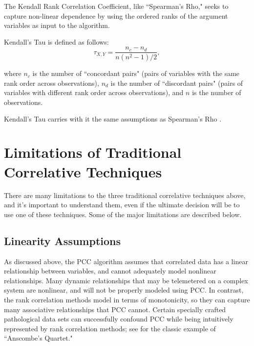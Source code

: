 The Kendall Rank Correlation Coefficient, like ``Spearman's Rho," seeks to capture non-linear dependence by using the ordered ranks of the argument variables as input to the algorithm.

Kendall's Tau is defined as follows:
\begin{equation} \label{eq:tau}
\tau_{X, Y} = \frac{n_{c} - n_{d}}{n(n^{2}-1)/2},
\end{equation}

where $n_{c}$ is the number of ``concordant pairs" (pairs of variables with the same rank order across observations), $n_{d}$ is the number of ``discordant pairs" (pairs of variables with different rank order across observations), and $n$ is the number of observations.

Kendall's Tau carries with it the same assumptions as Spearman's Rho \cite{kendalls2}.

\section{Limitations of Traditional Correlative Techniques}

There are many limitations to the three traditional correlative techniques above, and it's important to understand them, even if the ultimate decision will be to use one of these techniques. Some of the major limitations are described below.

\subsection{Linearity Assumptions}

As discussed above, the PCC algorithm assumes that correlated data has a linear relationship between variables, and cannot adequately model nonlinear relationships. Many dynamic relationships that may be telemetered on a complex system are nonlinear, and will not be properly modeled using PCC. In contrast, the rank correlation methods model in terms of monotonicity, so they can capture many associative relationships that PCC cannot. Certain specially crafted pathological data sets can successfully confound PCC while being intuitively represented by rank correlation methods; see \cite{anscombe1973graphs} for the classic example of ``Anscombe's Quartet."


